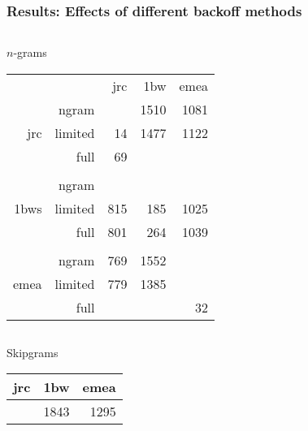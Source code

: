 \documentclass[11pt,t]{beamer}
\newcounter{acolumn}%
\begin{document}
\begin{frame}
    \frametitle{Results: Effects of different backoff methods}

    {\small
    \begin{acolumns}[T,totalwidth=\textwidth]
        \begin{column}{0.5\textwidth}
                \begin{block}{\hspace{2.55cm}$n$-grams\vphantom{Skipgrams}}
                \begin{tabular}{rrrrr}
                                          &       & jrc & 1bw  & emea \\ \cline{3-5}
                    \multirow{3}{*}{jrc}  & ngram & \cellcolor{green!25}{13}  & 1510 & 1081 \\
                                          & limited& 14  & 1477 & 1122 \\
                                          & full   & 69  & \cellcolor{green!25}{1195} & \cellcolor{green!25}{961}  \\
         &&&& \\
                    \multirow{3}{*}{1bws} & ngram & \cellcolor{green!25}{768} & \cellcolor{green!25}{158}  & \cellcolor{green!25}{946}  \\
                                          & limited& 815 & 185  & 1025 \\
                                          & full   & 801 & 264  & 1039 \\ 
         &&&& \\ 
                    \multirow{3}{*}{emea} & ngram & 769 & 1552 & \cellcolor{green!25}{4}    \\   
                                          & limited& 779 & 1385 & \cellcolor{green!25}{4}    \\
                                          & full   & \cellcolor{green!25}{600} & \cellcolor{green!25}{1143} & 32
                \end{tabular}
            \end{block}
        \end{column}
        \begin{column}{0.5\textwidth}
            \begin{block}{Skipgrams}
                \begin{tabular}{rrr}
                    jrc & 1bw  & emea \\ \hline
                    \cellcolor{green!25}{13}  & 1843 & 1295 \\

\end{tabular}
\end{block}
\end{column}
\end{acolumns}}
\end{frame}
\end{document}
